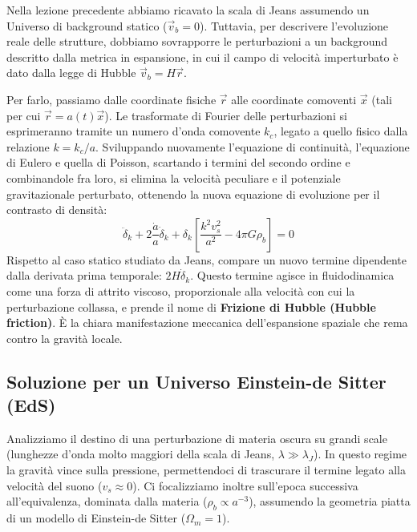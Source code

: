 \documentclass[11pt,a4paper]{report}
\begin{document}
Nella lezione precedente abbiamo ricavato la scala di Jeans assumendo un Universo di background statico ($\vec{v}_b = 0$). Tuttavia, per descrivere l'evoluzione reale delle strutture, dobbiamo sovrapporre le perturbazioni a un background descritto dalla metrica in espansione, in cui il campo di velocità imperturbato è dato dalla legge di Hubble $\vec{v}_b = H\vec{r}$.

Per farlo, passiamo dalle coordinate fisiche $\vec{r}$ alle coordinate comoventi $\vec{x}$ (tali per cui $\vec{r} = a(t)\vec{x}$). Le trasformate di Fourier delle perturbazioni si esprimeranno tramite un numero d'onda comovente $k_c$, legato a quello fisico dalla relazione $k = k_c / a$.
Sviluppando nuovamente l'equazione di continuità, l'equazione di Eulero e quella di Poisson, scartando i termini del secondo ordine e combinandole fra loro, si elimina la velocità peculiare e il potenziale gravitazionale perturbato, ottenendo la nuova equazione di evoluzione per il contrasto di densità:
\begin{equation}
\ddot{\delta}_k + 2\frac{\dot{a}}{a}\dot{\delta}_k + \delta_k \left[ \frac{k^2 v_s^2}{a^2} - 4\pi G \rho_b \right] = 0
\end{equation}
Rispetto al caso statico studiato da Jeans, compare un nuovo termine dipendente dalla derivata prima temporale: $2H\dot{\delta}_k$. Questo termine agisce in fluidodinamica come una forza di attrito viscoso, proporzionale alla velocità con cui la perturbazione collassa, e prende il nome di \textbf{Frizione di Hubble (Hubble friction)}. È la chiara manifestazione meccanica dell'espansione spaziale che rema contro la gravità locale.

\subsection{Soluzione per un Universo Einstein-de Sitter (EdS)}
Analizziamo il destino di una perturbazione di materia oscura su grandi scale (lunghezze d'onda molto maggiori della scala di Jeans, $\lambda \gg \lambda_J$). In questo regime la gravità vince sulla pressione, permettendoci di trascurare il termine legato alla velocità del suono ($v_s \approx 0$).
Ci focalizziamo inoltre sull'epoca successiva all'equivalenza, dominata dalla materia ($\rho_b \propto a^{-3}$), assumendo la geometria piatta di un modello di Einstein-de Sitter ($\Omega_m = 1$).
\end{document}
